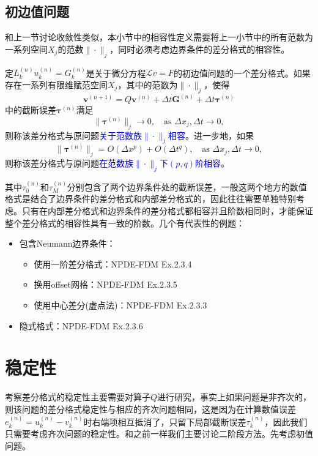 \documentclass[a4paper,10pt]{ctexart}
\begin{document}
\subsection{初边值问题}
和上一节讨论收敛性类似，本小节中的相容性定义需要将上一小节中的所有范数为一系列空间$ X_j $的范数$ \| \cdot \|_j $，同时必须考虑边界条件的差分格式的相容性。

\begin{definition}
    定$ L_k^{(n)}u^{(n)}_k = G^{(n)}_k $是关于微分方程$ \mathcal{L}v=F $的初边值问题的一个差分格式。如果存在一系列有限维赋范空间$ X_j $，其中的范数为$ \| \cdot \|_j $，使得
    \begin{equation}
        \bm{v}^{(n+1)} = Q \bm{v}^{(n)} + \Delta t \bm{G}^{(n)} + \Delta t \bm{\tau}^{(n)}
    \end{equation}
    中的截断误差$ \bm{\tau}^{(n)} $满足
    \begin{equation}
        \| \bm{\tau}^{(n)} \|_j \longrightarrow 0, \quad \text{as } \Delta x_j,\Delta t\longrightarrow 0,
    \end{equation}
    则称该差分格式与原问题\textcolor{blue}{关于范数族$ \| \cdot \|_j $相容}。进一步地，如果
    \begin{equation}
        \| \bm{\tau}^{(n)} \|_j = O(\Delta x^p) + O(\Delta t^q), \quad \text{as } \Delta x_j,\Delta t\longrightarrow 0,
    \end{equation}
    则称该差分格式与原问题\textcolor{blue}{在范数族$ \| \cdot \|_j $下$ (p,q) $阶相容}。
\end{definition}
\noindent 其中$ \tau^{(n)}_0 $和$ \tau^{(n)}_M $分别包含了两个边界条件处的截断误差，一般这两个地方的数值格式是结合了边界条件的差分格式和内部差分格式的，因此往往需要单独特别考虑。只有在内部差分格式和边界条件的差分格式都相容并且阶数相同时，才能保证整个差分格式的相容性具有一致的阶数。几个有代表性的例题：
\begin{itemize}
    \item 包含Neumann边界条件：
    \begin{itemize}
        \item 使用一阶差分格式：NPDE-FDM Ex.2.3.4
        \item 换用offset网格：NPDE-FDM Ex.2.3.5
        \item 使用中心差分(虚点法)：NPDE-FDM Ex.2.3.3
    \end{itemize}
    \item 隐式格式：NPDE-FDM Ex.2.3.6
\end{itemize}

\section{稳定性}
考察差分格式的稳定性主要需要对算子$ Q $进行研究，事实上如果问题是非齐次的，则该问题的差分格式稳定性与相应的齐次问题相同，这是因为在计算数值误差$ e^{(n)}_k = u^{(n)}_k - v^{(n)}_k $时右端项相互抵消了，只留下局部截断误差$ \tau^{(n)}_k $，因此我们只需要考虑齐次问题的稳定性。和之前一样我们主要讨论二阶段方法。先考虑初值问题。
\end{document}
